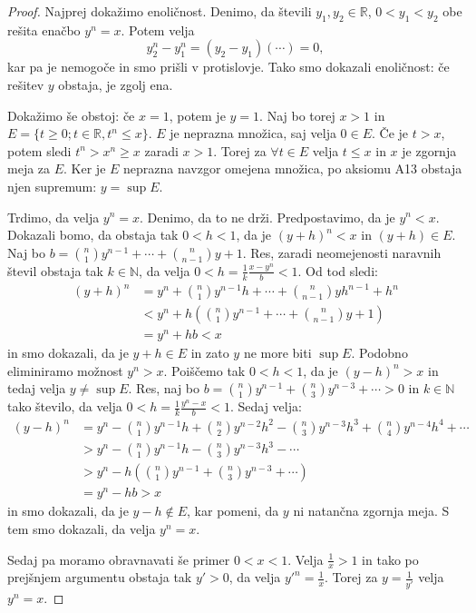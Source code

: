 \documentclass[10pt, a4paper]{article}
\newenvironment{noticeC}{%
  \tcolorbox[%
  notitle,
  empty,
  enhanced,  %
  breakable,
  coltext=black, 
  fontupper=\rmfamily,
  noparskip,
  sharp corners,
  boxrule=-1pt,  %
  frame hidden,
  left=7pt,  %
  right=7pt,
  top=5pt,
  bottom=5pt,
  before skip=2.5ex plus 2pt,
  after skip=2.5ex plus 2pt,
  overlay unbroken and last={%
  },
  ]}
{\endtcolorbox}
\newenvironment{dokaz}%
  {\begin{noticeC}\begin{proof}}%
  {\end{proof}\end{noticeC}}
\newcommand{\N}{\mathbb {N}}
\newcommand{\R}{\mathbb {R}}
\begin{document}
\begin{dokaz}
            Najprej dokažimo enoličnost. Denimo, da števili $y_1, y_2 \in \R$, $0 < y_1 <y_2$ obe rešita enačbo $y^n = x$.
            Potem velja $$y_2^{n} - y_1^{n} = (y_2 - y_1)(\cdots) = 0,$$ kar pa je nemogoče in smo prišli v protislovje. Tako smo dokazali enoličnost: če rešitev $y$ obstaja, je zgolj ena.
            
            Dokažimo še obstoj:
            če $x=1$, potem je $y=1$. Naj bo torej $x > 1$ in $E = \{t \geq 0; t \in \R, t^n \leq x\}$.
                $E$ je neprazna množica, saj velja $0 \in E$.
                Če je $t > x$, potem sledi $t^n > x^n \geq x$ zaradi $x > 1$. Torej za $\forall t \in E$ velja $t\leq x$ in $x$ je zgornja meja za $E$.
                Ker je $E$ neprazna navzgor omejena množica, po aksiomu A13 obstaja njen supremum: $y = \sup E$.
                
                Trdimo, da velja $y^n = x$. Denimo, da to ne drži. Predpostavimo, da je $y^n < x$. Dokazali bomo, da obstaja tak $0<h<1$, da je $(y+h)^n < x$ in $(y+h)\in E$.
                Naj bo $b = \binom{n}{1} y^{n-1} + \cdots + \binom{n}{n-1}y + 1.$
                Res, zaradi neomejenosti naravnih števil obstaja tak $k \in \N$, da velja $0 < h = \frac{1}{k} \frac{x-y^n}{b} < 1$. Od tod sledi:
                \begin{align*}
                    (y+h)^n &= y^n + \binom{n}{1} y^{n-1} h + \cdots + \binom{n}{n-1}y h^{n-1} + h^n\\
                    &< y^n + h \left(\binom{n}{1} y^{n-1} + \cdots + \binom{n}{n-1}y + 1 \right)\\
                    &= y^n + hb < x
                \end{align*}
                in smo dokazali, da je $y+h \in E$ in zato $y$ ne more biti $\sup E$. 
                Podobno eliminiramo možnost $y^n > x$. Poiščemo tak $0<h<1$, da je $(y-h)^n > x$ in tedaj velja $y \neq \sup E$. 
                Res, naj bo $b = \binom{n}{1}y^{n-1} + \binom{n}{3}y^{n-3} + \cdots > 0$ in $k \in \N$ tako število, da velja $0 < h = \frac{1}{k} \frac{y^n-x}{b} < 1$.
                Sedaj velja:
                \begin{align*}
                    (y-h)^n &= y^n - \binom{n}{1}y^{n-1}h + \binom{n}{2}y^{n-2}h^2 - \binom{n}{3}y^{n-3}h^{3} + \binom{n}{4}y^{n-4}h^4 + \cdots\\
                    &> y^n - \binom{n}{1}y^{n-1}h - \binom{n}{3}y^{n-3}h^{3} - \cdots\\
                    &> y^n - h \left( \binom{n}{1}y^{n-1} + \binom{n}{3}y^{n-3} + \cdots \right) \\
                    &= y^n - h b >x
                \end{align*}
                in smo dokazali, da je $y-h \notin E$, kar pomeni, da $y$ ni natančna zgornja meja. S tem smo dokazali, da velja $y^n = x$.
            
            Sedaj pa moramo obravnavati še primer $0<x<1$. Velja $\frac{1}{x} > 1$ in tako po prejšnjem argumentu obstaja tak $y'>0$, da velja $y'^n = \frac{1}{x}$. Torej za $y = \frac{1}{y'}$ velja $y^n = x$.
\end{dokaz}
\end{document}
